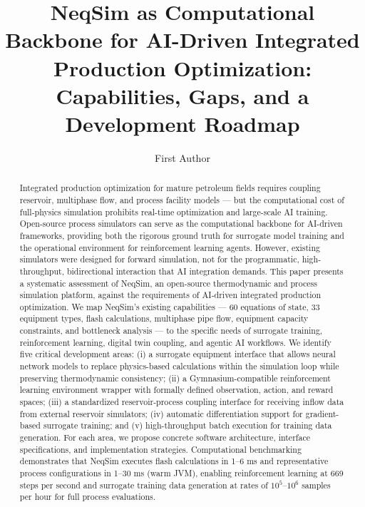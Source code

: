 \documentclass[review,3p]{custom}
\begin{document}
\linenumbers
\doublespacing

\begin{frontmatter}

\title{NeqSim as Computational Backbone for AI-Driven Integrated Production Optimization: Capabilities, Gaps, and a Development Roadmap}

\author[inst1]{First Author}


\begin{abstract}
Integrated production optimization for mature petroleum fields requires coupling reservoir, multiphase flow, and process facility models --- but the computational cost of full-physics simulation prohibits real-time optimization and large-scale AI training. Open-source process simulators can serve as the computational backbone for AI-driven frameworks, providing both the rigorous ground truth for surrogate model training and the operational environment for reinforcement learning agents. However, existing simulators were designed for forward simulation, not for the programmatic, high-throughput, bidirectional interaction that AI integration demands. This paper presents a systematic assessment of NeqSim, an open-source thermodynamic and process simulation platform, against the requirements of AI-driven integrated production optimization. We map NeqSim's existing capabilities --- 60 equations of state, 33 equipment types, flash calculations, multiphase pipe flow, equipment capacity constraints, and bottleneck analysis --- to the specific needs of surrogate training, reinforcement learning, digital twin coupling, and agentic AI workflows. We identify five critical development areas: (i) a surrogate equipment interface that allows neural network models to replace physics-based calculations within the simulation loop while preserving thermodynamic consistency; (ii) a Gymnasium-compatible reinforcement learning environment wrapper with formally defined observation, action, and reward spaces; (iii) a standardized reservoir-process coupling interface for receiving inflow data from external reservoir simulators; (iv) automatic differentiation support for gradient-based surrogate training; and (v) high-throughput batch execution for training data generation. For each area, we propose concrete software architecture, interface specifications, and implementation strategies. Computational benchmarking demonstrates that NeqSim executes flash calculations in 1--6 ms and representative process configurations in 1--30 ms (warm JVM), enabling reinforcement learning at 669 steps per second and surrogate training data generation at rates of $10^5$--$10^6$ samples per hour for full process evaluations.
\end{abstract}


\end{frontmatter}
\end{document}
